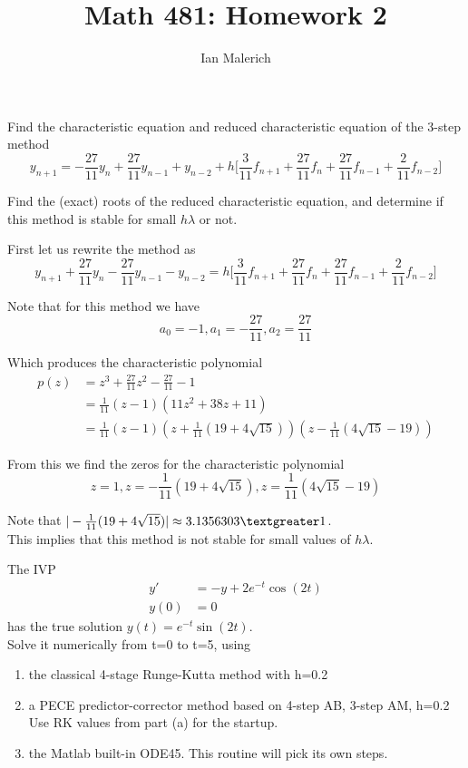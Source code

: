 \documentclass{jhwhw}
\author{Ian Malerich}
\title{Math 481: Homework 2}
\begin{document}
\raggedright

\problem{}

    Find the characteristic equation and reduced characteristic equation of the 3-step method
    $$
	y_{n+1} = -\frac{27}{11}y_n + \frac{27}{11}y_{n-1} + y_{n-2} + 
	h\biggr[\frac{3}{11}f_{n+1} + \frac{27}{11}f_n + \frac{27}{11}f_{n-1} + \frac{2}{11}f_{n-2}\biggr]
    $$

    Find the (exact) roots of the reduced characteristic equation, and determine if this method
    is stable for small $h\lambda$ or not.

\solution
    
    First let us rewrite the method as
    $$
	y_{n+1} + \frac{27}{11}y_n - \frac{27}{11}y_{n-1} - y_{n-2} =
	h\biggr[\frac{3}{11}f_{n+1} + \frac{27}{11}f_n + \frac{27}{11}f_{n-1} + \frac{2}{11}f_{n-2}\biggr]
    $$

    Note that for this method we have 
    $$
	a_0 = -1, a_1 = -\frac{27}{11}, a_2 = \frac{27}{11}
    $$

    Which produces the characteristic polynomial
    \begin{align*}
	p(z) &= z^3 + \frac{27}{11}z^2 - \frac{27}{11} - 1 \\
	&= \frac{1}{11}(z-1)(11z^2 + 38z+11) \\
	&= \frac{1}{11}(z-1)
	    (z + \frac{1}{11}(19 + 4\sqrt{15}))
	    (z - \frac{1}{11}(4\sqrt{15} - 19))
    \end{align*}

    From this we find the zeros for the characteristic polynomial
    $$
	z = 1,
	z = -\frac{1}{11}(19 + 4\sqrt{15}),
	z = \frac{1}{11}(4\sqrt{15} - 19)
    $$

    Note that $|-\frac{1}{11}(19 + 4\sqrt{15})| \approx 3.1356303 \textgreater 1$. \\
    This implies that this method is not stable for small values of $h\lambda$.

\problem{}

    The IVP
    \begin{align*}
	y' &= -y + 2e^{-t}\cos(2t) \\
	y(0) &= 0
    \end{align*}
    has the true solution $y(t) = e^{-t}\sin(2t)$. \\
    Solve it numerically from t=0 to t=5, using
    \begin{enumerate}
	\item the classical 4-stage Runge-Kutta method with h=0.2
	\item a PECE predictor-corrector method based on 4-step AB, 3-step AM, h=0.2 \\
	    Use RK values from part (a) for the startup.
	\item the Matlab built-in ODE45. This routine will pick its own steps.
    \end{enumerate}
\end{document}

